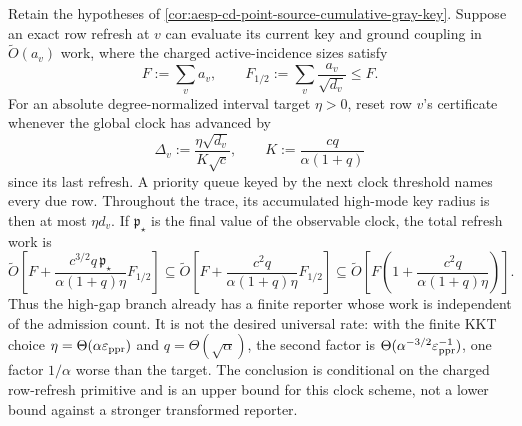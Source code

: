 \begin{corollary}
\label{cor:aesp-cd-point-source-clocked-gray-refresh}
Retain the hypotheses of
\cref{cor:aesp-cd-point-source-cumulative-gray-key}.  Suppose an exact row
refresh at \(v\) can evaluate its current key and ground coupling in
\(\widetilde O(a_v)\) work, where the charged active-incidence sizes satisfy
\begin{equation*}
 F:=\sum_v a_v,
 \qquad
 F_{1/2}:=\sum_v\frac{a_v}{\sqrt{d_v}}\leq F.
\end{equation*}
For an absolute degree-normalized interval target \(\eta>0\), reset row
\(v\)'s certificate whenever the global clock has advanced by
\begin{equation*}
 \Delta_v:=
 \frac{\eta\sqrt{d_v}}
      {K\sqrt c},
 \qquad
 K:=\frac{cq}{\alpha(1+q)}
\end{equation*}
since its last refresh.  A priority queue keyed by the next clock threshold
names every due row.  Throughout the trace, its accumulated high-mode key
radius is then at most \(\eta d_v\).  If \(\mathfrak p_\star\) is the final
value of the observable clock, the total refresh work is
\begin{equation}
 \widetilde O\!\left[
 F+
 \frac{c^{3/2}q\,\mathfrak p_\star}
      {\alpha(1+q)\eta}F_{1/2}
 \right]
 \subseteq
 \widetilde O\!\left[
 F+
 \frac{c^2q}{\alpha(1+q)\eta}F_{1/2}
 \right]
 \subseteq
 \widetilde O\!\left[
 F\left(1+\frac{c^2q}{\alpha(1+q)\eta}\right)
 \right].
 \label{eq:aesp-cd-point-source-clocked-gray-refresh-work}
\end{equation}
Thus the high-gap branch already has a finite reporter whose work is
independent of the admission count.  It is not the desired universal rate:
with the finite KKT choice \(\eta=\Theta(\alpha\varepsilon_{\rm ppr})\) and
\(q=\Theta(\sqrt\alpha)\), the second factor is
\(\Theta(\alpha^{-3/2}\varepsilon_{\rm ppr}^{-1})\), one factor
\(1/\alpha\) worse than the target.  The conclusion is conditional on the
charged row-refresh primitive and is an upper bound for this clock scheme,
not a lower bound against a stronger transformed reporter.
\end{corollary}

